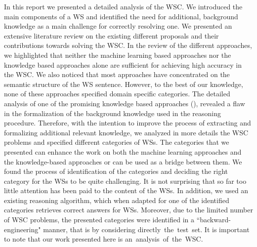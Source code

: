 In this report we presented a detailed analysis of the WSC. We introduced the main components of a WS and identified the need for  additional, background knowledge as a main challenge for correctly resolving one. We presented an extensive literature review on the existing different proposals and their contributions towards solving the WSC. In the review of the different approaches, we highlighted that neither the machine learning based approaches nor the knowledge based approaches alone are sufficient for achieving high accuracy in the WSC. We also noticed that most approaches have concentrated on the semantic structure of the WS sentence. However, to the best of our knowledge, none of these approaches specified domain specific categories. The detailed analysis of one of the promising knowledge based approaches (\cite{2018CommonsenseKT}), revealed a flaw in the formalization of the background knowledge used in the reasoning procedure. Therefore, with the intention to improve the process of extracting and formalizing additional relevant knowledge, we analyzed in more details the WSC problems and specified different categories of WSs. The categories that we presented can enhance the work on both the machine learning approaches and the knowledge-based approaches or can be used as a bridge between them. We found the process of identification of the categories and deciding the right category for the WSs to be quite challenging. It is not surprising that so far too little attention has been paid to the content of the WSs. In addition, we used an existing reasoning algorithm, which when adapted for one of the identified categories retrieves correct answers for WSs. 
Moreover, due to the limited number of WSC problems, the presented categories were identified in a ``backward-engineering" manner, that is by considering directly~the~test~set. It is important to note that our work presented here is an~analysis~of~the~WSC.

